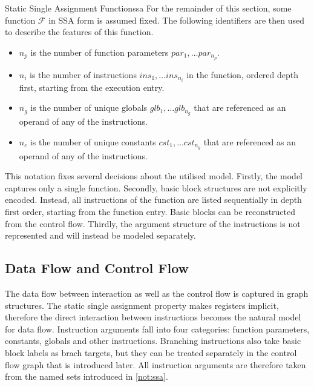 \begin{notation}{Static Single Assignment Function}{ssa}
    For the remainder of this section, some function $\mathcal F$ in SSA form is
    assumed fixed. 
    The following identifiers are then used to describe the features of this
    function.

    \begin{itemize}
    \item $n_p$ is the number of function parameters $par_1,\dots par_{n_p}$.
    \item $n_i$ is the number of instructions $ins_1,\dots ins_{n_i}$ in the
          function, ordered depth first, starting from the execution entry.
    \item $n_g$ is the number of unique globals $glb_1,\dots glb_{n_g}$ that are
          referenced as an operand of any of the instructions.
    \item $n_c$ is the number of unique constants $cst_1,\dots cst_{n_g}$ that
          are referenced as an operand of any of the instructions.
    \end{itemize}
\end{notation}

    This notation fixes several decisions about the utilised model.
    Firstly, the model captures only a single function.
    Secondly, basic block structures are not explicitly encoded.
    Instead, all instructions of the function are listed sequentially in depth
    first order, starting from the function entry.
    Basic blocks can be reconstructed from the control flow.
    Thirdly, the argument structure of the instructions is not represented and
    will instead be modeled separately.

\subsection{Data Flow and Control Flow}

    The data flow between interaction as well as the control flow is captured in
    graph structures.
    The static single assignment property makes registers implicit, therefore
    the direct interaction between instructions becomes the natural model for
    data flow.
    Instruction arguments fall into four categories: function parameters,
    constants, globals and other instructions.
    Branching instructions also take basic block labels as brach targets,
    but they can be treated separately in the control flow graph that is
    introduced later.
    All instruction arguments are therefore taken from the named sets introduced
    in \autoref{not:ssa}.

